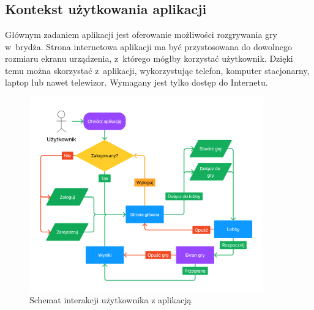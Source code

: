 \chapter{\ChapterTitleScope}
\label{sec:zakres-funkcjonalnosci}


\section{Kontekst użytkowania aplikacji}

Głównym zadaniem aplikacji jest oferowanie możliwości
rozgrywania gry w~brydża. Strona internetowa aplikacji ma być
przystosowana do dowolnego rozmiaru ekranu urządzenia, z~którego mógłby
korzystać użytkownik. Dzięki temu można skorzystać z~aplikacji, wykorzystując
telefon, komputer stacjonarny, laptop lub nawet telewizor. Wymagany
jest tylko dostęp do Internetu. \\

\begin{figure}[h!]
    \centering
    \includegraphics[width=0.9\textwidth]{img/flow-aplikacji/user_flow.png}
    \caption{Schemat interakcji użytkownika z aplikacją}
    \label{fig:figma_userflow}
\end{figure}

